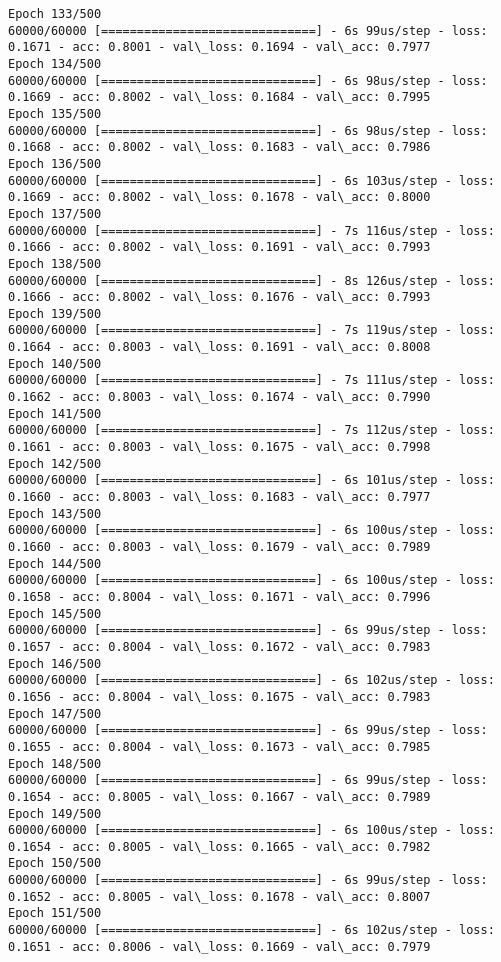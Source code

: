 \documentclass[11pt]{article}
\begin{document}
\begin{Verbatim}[commandchars=\\\{\}]
Epoch 133/500
60000/60000 [==============================] - 6s 99us/step - loss: 0.1671 - acc: 0.8001 - val\_loss: 0.1694 - val\_acc: 0.7977
Epoch 134/500
60000/60000 [==============================] - 6s 98us/step - loss: 0.1669 - acc: 0.8002 - val\_loss: 0.1684 - val\_acc: 0.7995
Epoch 135/500
60000/60000 [==============================] - 6s 98us/step - loss: 0.1668 - acc: 0.8002 - val\_loss: 0.1683 - val\_acc: 0.7986
Epoch 136/500
60000/60000 [==============================] - 6s 103us/step - loss: 0.1669 - acc: 0.8002 - val\_loss: 0.1678 - val\_acc: 0.8000
Epoch 137/500
60000/60000 [==============================] - 7s 116us/step - loss: 0.1666 - acc: 0.8002 - val\_loss: 0.1691 - val\_acc: 0.7993
Epoch 138/500
60000/60000 [==============================] - 8s 126us/step - loss: 0.1666 - acc: 0.8002 - val\_loss: 0.1676 - val\_acc: 0.7993
Epoch 139/500
60000/60000 [==============================] - 7s 119us/step - loss: 0.1664 - acc: 0.8003 - val\_loss: 0.1691 - val\_acc: 0.8008
Epoch 140/500
60000/60000 [==============================] - 7s 111us/step - loss: 0.1662 - acc: 0.8003 - val\_loss: 0.1674 - val\_acc: 0.7990
Epoch 141/500
60000/60000 [==============================] - 7s 112us/step - loss: 0.1661 - acc: 0.8003 - val\_loss: 0.1675 - val\_acc: 0.7998
Epoch 142/500
60000/60000 [==============================] - 6s 101us/step - loss: 0.1660 - acc: 0.8003 - val\_loss: 0.1683 - val\_acc: 0.7977
Epoch 143/500
60000/60000 [==============================] - 6s 100us/step - loss: 0.1660 - acc: 0.8003 - val\_loss: 0.1679 - val\_acc: 0.7989
Epoch 144/500
60000/60000 [==============================] - 6s 100us/step - loss: 0.1658 - acc: 0.8004 - val\_loss: 0.1671 - val\_acc: 0.7996
Epoch 145/500
60000/60000 [==============================] - 6s 99us/step - loss: 0.1657 - acc: 0.8004 - val\_loss: 0.1672 - val\_acc: 0.7983
Epoch 146/500
60000/60000 [==============================] - 6s 102us/step - loss: 0.1656 - acc: 0.8004 - val\_loss: 0.1675 - val\_acc: 0.7983
Epoch 147/500
60000/60000 [==============================] - 6s 99us/step - loss: 0.1655 - acc: 0.8004 - val\_loss: 0.1673 - val\_acc: 0.7985
Epoch 148/500
60000/60000 [==============================] - 6s 99us/step - loss: 0.1654 - acc: 0.8005 - val\_loss: 0.1667 - val\_acc: 0.7989
Epoch 149/500
60000/60000 [==============================] - 6s 100us/step - loss: 0.1654 - acc: 0.8005 - val\_loss: 0.1665 - val\_acc: 0.7982
Epoch 150/500
60000/60000 [==============================] - 6s 99us/step - loss: 0.1652 - acc: 0.8005 - val\_loss: 0.1678 - val\_acc: 0.8007
Epoch 151/500
60000/60000 [==============================] - 6s 102us/step - loss: 0.1651 - acc: 0.8006 - val\_loss: 0.1669 - val\_acc: 0.7979

\end{Verbatim}
\end{document}
